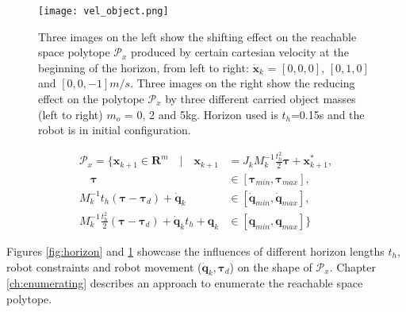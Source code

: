 \begin{figure}[!t]
    \centering
    \texttt{[image: vel\_object.png]}
    \caption{Three images on the left show the shifting effect on the reachable space polytope $\mathcal{P}_x$ produced by certain cartesian velocity at the beginning of the horizon, from left to right: $\dot{\bm{x}}_k$ = $[0,0,0]$, $[0,1,0] $ and $[0,0,-1]m/s$. Three images on the right show the reducing effect on the polytope $\mathcal{P}_x$ by three different carried object masses (left to right) $m_o$ = 0, 2 and 5kg. Horizon used is $t_h$=0.15s and the robot is in initial configuration.}
    \label{fig:velocity}
    \vspace{-1cm}
\end{figure}


\begin{equation}
\begin{split}
    \mathcal{P}_x = \{ \bm{x}_{k+1} \in \mathbf{R}^m \quad| \quad \bm{x}_{k+1} &= J_k M_k^{-1}\frac{t_h^2}{2}\bm{\tau} + \bm{x}^*_{k+1},\\
    \quad \bm{\tau} &\in \left[\bm{\tau}_{min},\bm{\tau}_{max}\right],\\
   M_k^{-1}t_h (\bm{\tau} - \bm{\tau}_d) + \dot{\bm{q}}_{k} &\in \left[\dot{\bm{q}}_{min},\dot{\bm{q}}_{max}\right],\\
   M_k^{-1}\frac{t_h^2}{2}(\bm{\tau} - \bm{\tau}_d) +  \dot{\bm{q}}_{k}t_h + \bm{q}_{k} &\in \left[\bm{q}_{min},\bm{q}_{max}\right] \}
\end{split} 
\label{eq:polytope_simple}
\end{equation}

Figures \ref{fig:horizon} and \ref{fig:velocity} showcase the influences of different horizon lengths $t_h$, robot constraints and robot movement ($\dot{\bm{q}}_k,\bm{\tau}_d$) on the shape of $\mathcal{P}_x$. Chapter \ref{ch:enumerating} describes an approach to enumerate the reachable space polytope. 




